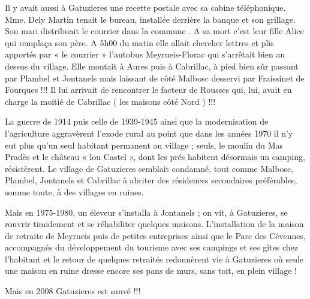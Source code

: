 \vspace{0.3cm}

Il y avait aussi à Gatuzieres une recette postale avec sa cabine téléphonique. Mme. Dely
Martin tenait le bureau, installée derrière la banque et son grillage. Son mari distribuait le
courrier dans la commune . A sa mort c’est leur fille Alice qui remplaça son père. A 5h00 du
matin elle allait chercher lettres et plis apportés par « le courrier » l’autobus Meyrueis-Florac
qui s’arrêtait bien au dessus du village. Elle montait à Aures puis à Cabrillac, à pied bien sûr
passant par Plambel et Jontanels mais laissant de côté Malbosc desservi par Fraissinet de
Fourques !!! Il lui arrivait de rencontrer le facteur de Rousses qui, lui, avait en charge la
moitié de Cabrillac ( les maisons côté Nord ) !!!

\vspace{0.3cm}

La guerre de 1914 puis celle de 1939-1945 ainsi que la modernisation de l’agriculture
aggravèrent l’exode rural au point que dans les années 1970 il n’y eut plus qu’un seul habitant
permanent au village ; seuls, le moulin du Mas Pradès et le château « lou Castel », dont les
prés habitent désormais un camping, résistèrent.
Le village de Gatuzieres semblait condamné, tout comme Malbosc, Plambel, Jontanels et Cabrillac à
abriter des résidences secondaires préférables, somme toute, à des villages en ruines.

\vspace{0.3cm}

Mais en 1975-1980, un éleveur s’installa à Jontanels ; on vit, à Gatuzieres, se rouvrir
timidement et se réhabiliter quelques maisons. L’installation de la maison de retraite de
Meyrueis puis de petites entreprises ainsi que le Parc des Cévennes, accompagnés du
développement du tourisme avec ses campings et ses gîtes chez l’habitant et le retour de
quelques retraités redonnèrent vie à Gatuzieres où seule une maison en ruine dresse encore ses
pans de murs, sans toit, en plein village !

\vspace{0.35cm}

\begin{center}
    Mais en 2008 Gatuzieres est sauvé !!!
\end{center}
